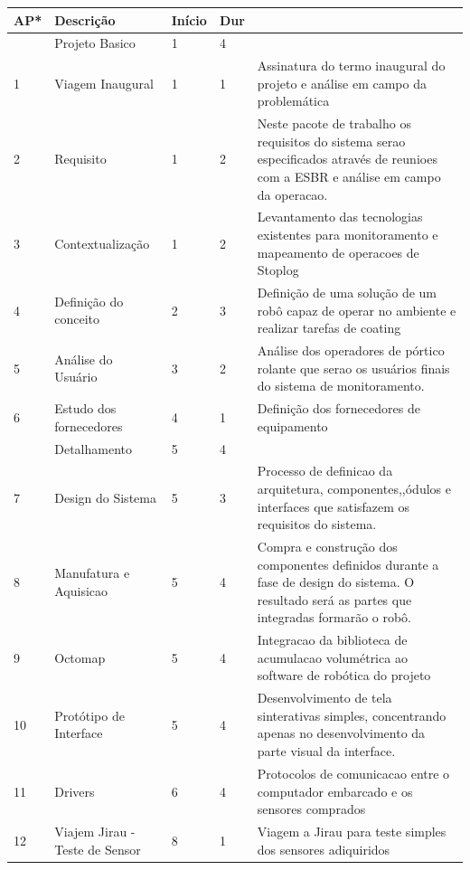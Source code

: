 \begin{longtable}{ | l | p{4cm} | l | l | p{5cm} | }
\hline
    \rowcolor{Gray}
	AP* & Descrição & Início & Dur &  \  \\ \hline
	 & Projeto Basico & 1 & 4 & \ \\ \hline
	1 & Viagem Inaugural & 1 & 1 &  Assinatura do termo inaugural do projeto e
	análise em campo da problemática \\ \hline 
	2 & Requisito & 1 & 2 & Neste pacote de trabalho os requisitos do sistema serao
	especificados através de reunioes com a ESBR e análise em campo da operacao.    \\ \hline 
	3 & Contextualização & 1 & 2 & Levantamento das tecnologias existentes para monitoramento e mapeamento de operacoes de Stoplog \\ \hline
	4 & Definição do conceito & 2 & 3 & Definição de uma solução de um robô capaz
	 de operar no ambiente e realizar tarefas de coating   \\ \hline 
	5 & Análise do Usuário & 3 & 2 & Análise dos operadores de pórtico rolante que
	 serao os usuários finais do sistema de monitoramento.  \\ \hline 
	6 & Estudo dos \newline fornecedores & 4 & 1 & Definição dos fornecedores
	de equipamento \\ \hline 
	\rowcolor{Gray}
	  & Detalhamento & 5 & 4 &  \  \\ \hline
	7 & Design do Sistema & 5 & 3 & Processo de definicao da arquitetura,
	componentes,,ódulos e interfaces que satisfazem os requisitos do sistema. \\
	\hline 8 & Manufatura \newline e Aquisicao & 5 & 4 & Compra e construção dos
	componentes definidos durante a fase de design do sistema. O resultado será as partes que integradas formarão o robô.  \\ \hline 9 & Octomap & 5 & 4
	& Integracao da biblioteca de acumulacao volumétrica ao software de robótica
	do projeto \\ \hline 10 & Protótipo de Interface & 5 & 4 & Desenvolvimento de
	tela sinterativas simples, concentrando apenas no desenvolvimento da parte
	visual da interface. \\ \hline 11 & Drivers & 6 & 4 & Protocolos de
	comunicacao entre o computador embarcado e os sensores comprados \\ \hline 12
	& Viajem Jirau - Teste de Sensor & 8 & 1 & Viagem a Jirau para teste simples
	dos sensores adiquiridos  \\ \hline

\end{longtable}
